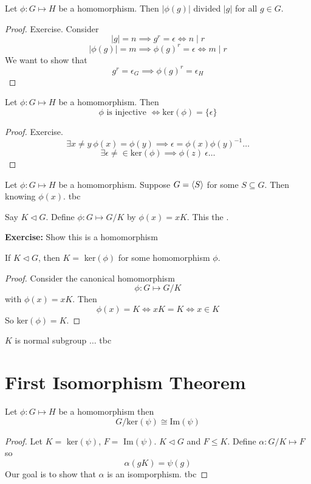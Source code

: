 \documentclass[openany]{report}
\begin{document}
\begin{theorem}
    Let $\phi: G \mapsto H$ be a homomorphism. Then $|\phi(g)|$ divided $|g|$ for all $g \in G$.
\end{theorem}
\begin{proof}
    Exercise. Consider 
    \[|g| = n \implies g^r = \epsilon \iff n \mid r\]
    \[|\phi(g)| = m \implies \phi(g)^r = \epsilon \iff m \mid r\]
    We want to show that 
    \[g^r = \epsilon_G \implies \phi(g)^r = \epsilon_H\] 
\end{proof}

\begin{theorem}
    Let $\phi: G \mapsto H$ be a homomorphism. Then 
    \[\phi \text{ is injective } \iff \text{ker}(\phi) = \{\epsilon\}\]
\end{theorem}
\begin{proof}
    Exercise. 
    \[\exists x \neq y \ \phi(x) = \phi(y) \implies \epsilon = \phi(x)\phi(y)^{-1} \ldots\]
    \[\exists \epsilon \neq \in \text{ker}(\phi) \implies \phi(z) \ \epsilon \ldots\] 
\end{proof}


\begin{theorem}
    Let $\phi: G \mapsto H$ be a homomorphism. Suppose $G = \langle S \rangle$ for some $S \subseteq G$. Then knowing $\phi(x)$. tbc
\end{theorem}

\begin{definition}
    Say $K \triangleleft G$. Define $\phi: G \mapsto G/K$ by $\phi(x) = xK$. This the .
\end{definition}
\noindent
\textbf{Exercise:} Show this is a homomorphism

\begin{theorem}
    If $K \triangleleft G$, then $K =$ ker$(\phi)$ for some homomorphism $\phi$.
\end{theorem}
\begin{proof}
    Consider the canonical homomorphism
    \[\phi: G \mapsto G/K\]
    with $\phi(x) = xK$. Then
    \[\phi(x) = K \iff xK = K \iff x \in K\]
    So ker$(\phi) = K$.
\end{proof}


\begin{corollary}
    $K$ is normal subgroup $\ldots$ tbc 
\end{corollary}

\section{First Isomorphism Theorem}
\begin{theorem}
    Let $\phi: G \mapsto H$ be a homomorphism then 
    \[G / \text{ker}(\psi) \cong \text{Im}(\psi)\]
\end{theorem}

\begin{proof}
    Let $K = $ ker$(\psi)$, $F =$ Im$(\psi)$. $K \triangleleft G$ and $F \leq K$. Define $\alpha: G/K \mapsto F$ so
    \[\alpha(gK) = \psi(g)\]
    Our goal is to show that $\alpha$ is an isomporphism. tbc
\end{proof}
\end{document}
